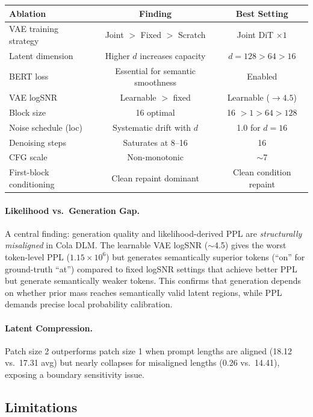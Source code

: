 \documentclass[11pt]{article}
\begin{document}
\begin{center}
\begin{tabular}{lcc}
\toprule
\textbf{Ablation} & \textbf{Finding} & \textbf{Best Setting} \\
\midrule
VAE training strategy & Joint $>$ Fixed $>$ Scratch & Joint DiT $\times 1$ \\
Latent dimension & Higher $d$ increases capacity & $d = 128 > 64 > 16$ \\
BERT loss & Essential for semantic smoothness & Enabled \\
VAE logSNR & Learnable $>$ fixed & Learnable ($\to 4.5$) \\
Block size & 16 optimal & 16 $> 1 > 64 > 128$ \\
Noise schedule (loc) & Systematic drift with $d$ & 1.0 for $d = 16$ \\
Denoising steps & Saturates at 8--16 & 16 \\
CFG scale & Non-monotonic & $\sim$7 \\
First-block conditioning & Clean repaint dominant & Clean condition repaint \\
\bottomrule
\end{tabular}
\end{center}

\paragraph{Likelihood vs.\ Generation Gap.}
A central finding: generation quality and likelihood-derived PPL are \emph{structurally misaligned} in Cola DLM. The learnable VAE logSNR ($\sim$4.5) gives the worst token-level PPL ($1.15 \times 10^6$) but generates semantically superior tokens (``on'' for ground-truth ``at'') compared to fixed logSNR settings that achieve better PPL but generate semantically weaker tokens. This confirms that generation depends on whether prior mass reaches semantically valid latent regions, while PPL demands precise local probability calibration.

\paragraph{Latent Compression.}
Patch size 2 outperforms patch size 1 when prompt lengths are aligned (18.12 vs.\ 17.31 avg) but nearly collapses for misaligned lengths (0.26 vs.\ 14.41), exposing a boundary sensitivity issue.

\subsection{Limitations}
\end{document}
